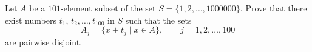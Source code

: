 Let $A$ be a $101$-element subset of the set $S=\{1,2,\ldots,1000000\}$. Prove that there exist numbers $t_1$,  $t_2, \ldots, t_{100}$ in $S$ such that the sets  \[ A_j=\{x+t_j\mid x\in A\},\qquad j=1,2,\ldots,100  \]  are pairwise disjoint.